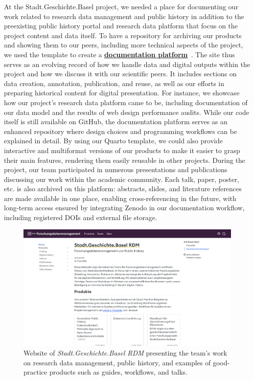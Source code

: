\documentclass[final]{anthology-ch} %
\begin{document}
At the Stadt.Geschichte.Basel project, we needed a place for documenting our work related to research data management and public history in addition to the preexisting public history portal and research data platform that focus on the project content and data itself. To have a repository for archiving our products and showing them to our peers, including more technical aspects of the project, we used the template to create a \href{https://dokumentation.stadtgeschichtebasel.ch}{\textbf{documentation platform}}~\cite{maehr2024g}. The site thus serves as an evolving record of how we handle data and digital outputs within the project and how we discuss it with our scientific peers. It includes sections on data creation, annotation, publication, and reuse, as well as our efforts in preparing historical content for digital presentation. For instance, we showcase how our project's research data platform came to be, including documentation of our data model and the results of web design performance audits. While our code itself is still available on GitHub, the documentation platform serves as an enhanced repository where design choices and programming workflows can be explained in detail. By using our Quarto template, we could also provide interactive and multiformat versions of our products to make it easier to grasp their main features, rendering them easily reusable in other projects. During the project, our team participated in numerous presentations and publications discussing our work within the academic community. Each talk, paper, poster, etc. is also archived on this platform: abstracts, slides, and literature references are made available in one place, enabling cross-referencing in the future, with long-term access ensured by integrating Zenodo in our documentation workflow, including registered DOIs and external file storage.

\begin{figure}[t!]
  \centering
  \includegraphics[width=0.9\linewidth]{figures/dokumentation_stadtgeschichtebasel_ch.png}
  \caption{Website of \emph{Stadt.Geschichte.Basel RDM} presenting the team's work on research data management, public history, and examples of good-practice products such as guides, workflows, and talks.}
  \label{fig-sgb-rdm}
\end{figure}
\end{document}
